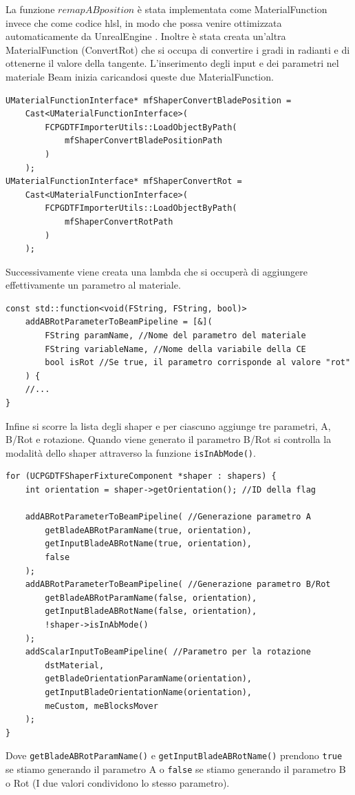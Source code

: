 \documentclass[main.tex]{subfiles}
\begin{document}
La funzione $remapABposition$ è stata implementata come MaterialFunction invece che come codice hlsl, in modo che possa venire ottimizzata automaticamente da UnrealEngine \cite{hlslNoOptimize}. Inoltre è stata creata un'altra MaterialFunction (ConvertRot) che si occupa di convertire i gradi in radianti e di ottenerne il valore della tangente. L'inserimento degli input e dei parametri nel materiale Beam inizia caricandosi queste due MaterialFunction.
\begin{lstlisting}
UMaterialFunctionInterface* mfShaperConvertBladePosition =
    Cast<UMaterialFunctionInterface>(
        FCPGDTFImporterUtils::LoadObjectByPath(
            mfShaperConvertBladePositionPath
        )
    );
UMaterialFunctionInterface* mfShaperConvertRot =
    Cast<UMaterialFunctionInterface>(
        FCPGDTFImporterUtils::LoadObjectByPath(
            mfShaperConvertRotPath
        )
    );
\end{lstlisting}
Successivamente viene creata una lambda che si occuperà di aggiungere effettivamente un parametro al materiale.
\begin{lstlisting}
const std::function<void(FString, FString, bool)>
    addABRotParameterToBeamPipeline = [&](
        FString paramName, //Nome del parametro del materiale
        FString variableName, //Nome della variabile della CE
        bool isRot //Se true, il parametro corrisponde al valore "rot"
    ) {
    //...
}
\end{lstlisting}
Infine si scorre la lista degli shaper e per ciascuno aggiunge tre parametri, A, B/Rot e rotazione. Quando viene generato il parametro B/Rot si controlla la modalità dello shaper attraverso la funzione \lstinline{isInAbMode()}.
\begin{lstlisting}
for (UCPGDTFShaperFixtureComponent *shaper : shapers) {
    int orientation = shaper->getOrientation(); //ID della flag

    addABRotParameterToBeamPipeline( //Generazione parametro A
        getBladeABRotParamName(true, orientation),
        getInputBladeABRotName(true, orientation),
        false
    );
    addABRotParameterToBeamPipeline( //Generazione parametro B/Rot
        getBladeABRotParamName(false, orientation),
        getInputBladeABRotName(false, orientation),
        !shaper->isInAbMode()
    );
    addScalarInputToBeamPipeline( //Parametro per la rotazione
        dstMaterial,
        getBladeOrientationParamName(orientation),
        getInputBladeOrientationName(orientation),
        meCustom, meBlocksMover
    );
}
\end{lstlisting}
Dove \lstinline{getBladeABRotParamName()} e \lstinline{getInputBladeABRotName()} prendono \lstinline{true} se stiamo generando il parametro A o \lstinline{false} se stiamo generando il parametro B o Rot (I due valori condividono lo stesso parametro). \newline
\end{document}
